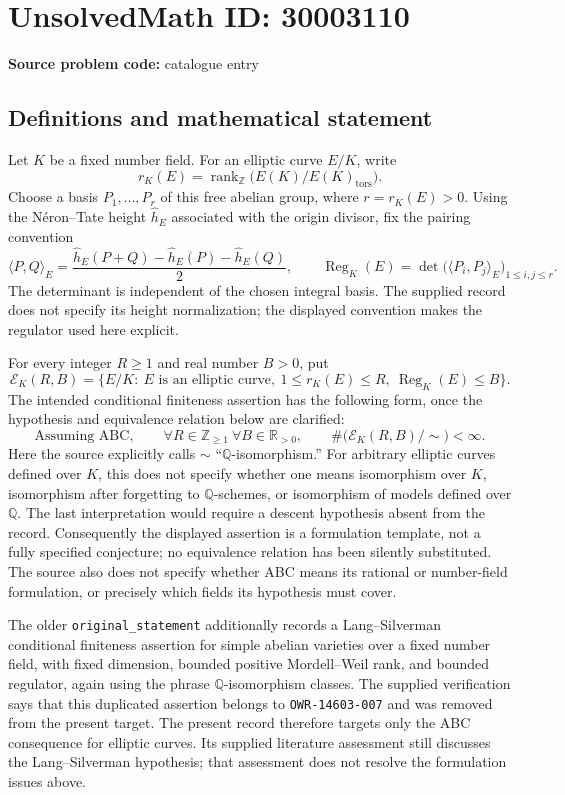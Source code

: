 \documentclass[11pt]{article}
\newcommand{\Z}{\mathbb{Z}}
\newcommand{\Q}{\mathbb{Q}}
\newcommand{\R}{\mathbb{R}}
\begin{document}
\section*{UnsolvedMath ID: 30003110}
\textbf{Source problem code:} catalogue entry
\subsection{Definitions and mathematical statement}
Let \(K\) be a fixed number field. For an elliptic curve \(E/K\), write
\[
r_K(E)=\operatorname{rank}_{\Z}\bigl(E(K)/E(K)_{\mathrm{tors}}\bigr).
\]
Choose a basis \(P_1,\ldots,P_r\) of this free abelian group, where \(r=r_K(E)>0\). Using the N\'eron--Tate height \(\widehat h_E\) associated with the origin divisor, fix the pairing convention
\[
\langle P,Q\rangle_E=\frac{\widehat h_E(P+Q)-\widehat h_E(P)-\widehat h_E(Q)}{2},
\qquad
\operatorname{Reg}_K(E)=\det\bigl(\langle P_i,P_j\rangle_E\bigr)_{1\leq i,j\leq r}.
\]
The determinant is independent of the chosen integral basis. The supplied record does not specify its height normalization; the displayed convention makes the regulator used here explicit.

For every integer \(R\geq1\) and real number \(B>0\), put
\[
\mathcal E_K(R,B)=\{E/K:\ E\text{ is an elliptic curve},\ 1\leq r_K(E)\leq R,\ \operatorname{Reg}_K(E)\leq B\}.
\]
The intended conditional finiteness assertion has the following form, once the hypothesis and equivalence relation below are clarified:
\[
\text{Assuming ABC},\qquad
\forall R\in\Z_{\geq1}\ \forall B\in\R_{>0},\qquad
\#\bigl(\mathcal E_K(R,B)/{\sim}\bigr)<\infty.
\]
Here the source explicitly calls \(\sim\) ``\(\Q\)-isomorphism.'' For arbitrary elliptic curves defined over \(K\), this does not specify whether one means isomorphism over \(K\), isomorphism after forgetting to \(\Q\)-schemes, or isomorphism of models defined over \(\Q\). The last interpretation would require a descent hypothesis absent from the record. Consequently the displayed assertion is a formulation template, not a fully specified conjecture; no equivalence relation has been silently substituted. The source also does not specify whether ABC means its rational or number-field formulation, or precisely which fields its hypothesis must cover.

The older \texttt{original\_statement} additionally records a Lang--Silverman conditional finiteness assertion for simple abelian varieties over a fixed number field, with fixed dimension, bounded positive Mordell--Weil rank, and bounded regulator, again using the phrase \(\Q\)-isomorphism classes. The supplied verification says that this duplicated assertion belongs to \texttt{OWR-14603-007} and was removed from the present target. The present record therefore targets only the ABC consequence for elliptic curves. Its supplied literature assessment still discusses the Lang--Silverman hypothesis; that assessment does not resolve the formulation issues above.
\end{document}
